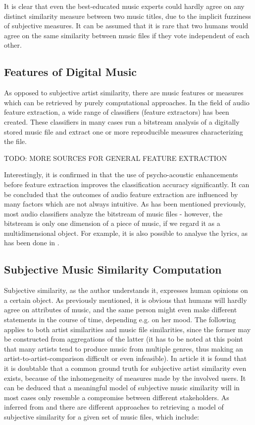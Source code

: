 It is clear that even the best-educated music experts could hardly agree on 
any distinct similarity measure between two music titles, due to the implicit fuzziness of subjective measures.
It can be assumed that it is rare that two humans would agree on the same similarity between music files
if they vote independent of each other.

\subsection{Features of Digital Music}

As opposed to subjective artist similarity, there are music features or measures which can be retrieved by
purely computational approaches. In the field of audio feature extraction, a wide range of classifiers
(feature extractors) has been created. These classifiers in many cases run a bitstream analysis of a digitally
stored music file and extract one or more reproducible measures characterizing the file. 



TODO: MORE SOURCES FOR GENERAL FEATURE EXTRACTION



Interestingly, it is confirmed in \cite{LID_05ismir} that the use of psycho-acoustic enhancements before
feature extraction improves the classification accuracy significantly. It can be concluded that the outcomes of
audio feature extraction are influenced by many factors which are not always intuitive.
As has been mentioned previously, most audio classifiers analyze the bitstream of music files - however,
the bitstream is only one dimension of a piece of music, if we regard it as a multidimensional object. For example,
it is also possible to analyse the lyrics, as has been done in \cite{DBLP:conf/ismir/MayerNR08}.

\subsection{Subjective Music Similarity Computation}

Subjective similarity, as the author understands it, expresses human opinions on a certain object. As previously
mentioned, it is obvious that humans will hardly agree on attributes of music, and the same person might even make
different statements in the course of time, depending e.g. on her mood. The following applies to both artist 
similarities and music file similarities, since the former may be constructed from aggregations of the latter 
(it has to be noted at this point that many artists tend to produce music from multiple genres, thus making
an artist-to-artist-comparison difficult or even infeasible).
In article \cite{Ellis02thequest} it is found that it is doubtable that a common ground truth for subjective
artist similarity even exists, because of the inhomegeneity of measures made by the involved users. It can be
deduced that a meaningful model of subjective music similarity will in most cases only resemble a compromise
between different stakeholders.
As inferred from \cite{Berenzweig03alarge-scale} and \cite{mcfee09_hesas} there are different approaches to 
retrieving a model of subjective similarity for a given set of music files, which include:

